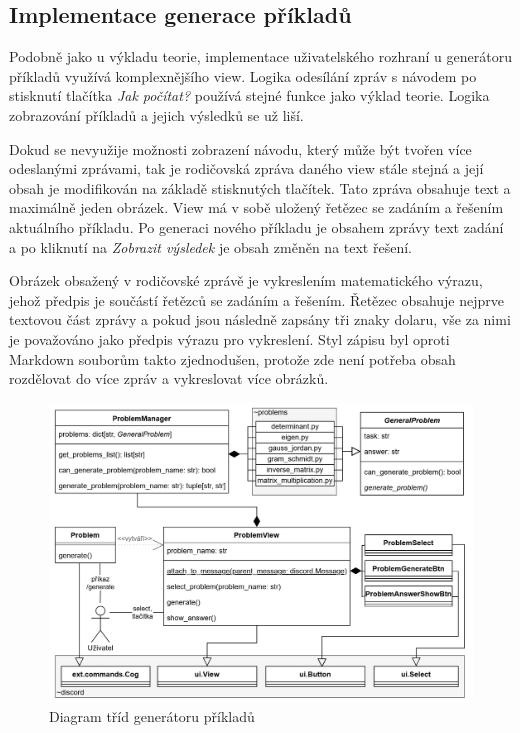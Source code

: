 \documentclass[FM]{tulthesis}
\begin{document}
	\subsection{Implementace generace příkladů}
	
	Podobně jako u výkladu teorie, implementace uživatelského rozhraní u generátoru příkladů využívá komplexnějšího view. Logika odesílání zpráv s návodem po stisknutí tlačítka \textit{Jak počítat?} používá stejné funkce jako výklad teorie. Logika zobrazování příkladů a jejich výsledků se už liší.
	
	Dokud se nevyužije možnosti zobrazení návodu, který může být tvořen více odeslanými zprávami, tak je rodičovská zpráva daného view stále stejná a její obsah je modifikován na základě stisknutých tlačítek. Tato zpráva obsahuje text a maximálně jeden obrázek. View má v sobě uložený řetězec se zadáním a řešením aktuálního příkladu. Po generaci nového příkladu je obsahem zprávy text zadání a po kliknutí na \textit{Zobrazit výsledek} je obsah změněn na text řešení.
	
	Obrázek obsažený v rodičovské zprávě je vykreslením matematického výrazu, jehož předpis je součástí řetězců se zadáním a řešením. Řetězec obsahuje nejprve textovou část zprávy a pokud jsou následně zapsány tři znaky dolaru, vše za nimi je považováno jako předpis výrazu pro vykreslení. Styl zápisu byl oproti \mbox{Markdown} souborům takto zjednodušen, protože zde není potřeba obsah rozdělovat do více zpráv a vykreslovat více obrázků.
	
	\begin{figure}[ht]
		\centering
		\includegraphics[width=\textwidth]{img/ProblemsDiagram}
		\caption{Diagram tříd generátoru příkladů}
		\label{_tag_img_problemuml}
	\end{figure}
	
\end{document}
